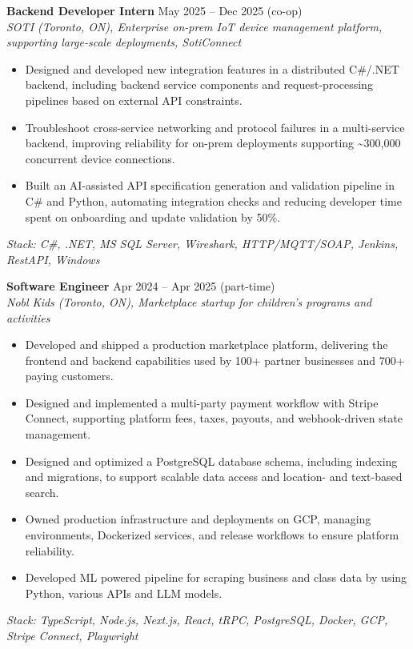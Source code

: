\documentclass[10pt,a4paper]{article}
\begin{document}
\textbf{Backend Developer Intern} \hfill May 2025 -- Dec 2025 (co-op)\\
\textit{SOTI (Toronto, ON), Enterprise on-prem IoT device management platform, supporting large-scale deployments, SotiConnect}
\begin{itemize}
    \item Designed and developed new integration features in a distributed C\#/.NET backend, including backend service components
    and request-processing pipelines based on external API constraints.
    \item Troubleshoot cross-service networking and protocol failures in a multi-service backend, improving reliability for on-prem
    deployments supporting \textasciitilde300{,}000 concurrent device connections.
    \item Built an AI-assisted API specification generation and validation pipeline in C\# and Python, automating integration checks and
    reducing developer time spent on onboarding and update validation by 50\%.
\end{itemize}
\textit{Stack: C\#, .NET, MS SQL Server, Wireshark, HTTP/MQTT/SOAP, Jenkins, RestAPI, Windows}

\vspace{0.45em}

\textbf{Software Engineer} \hfill Apr 2024 -- Apr 2025 (part-time)\\
\textit{Nobl Kids (Toronto, ON), Marketplace startup for children’s programs and activities}
\begin{itemize}
    \item Developed and shipped a production marketplace platform, delivering the frontend and backend capabilities used by 100+
    partner businesses and 700+ paying customers.
    \item Designed and implemented a multi-party payment workflow with Stripe Connect, supporting platform fees, taxes, payouts, and
    webhook-driven state management.
    \item Designed and optimized a PostgreSQL database schema, including indexing and migrations, to support scalable data access
    and location- and text-based search.
    \item Owned production infrastructure and deployments on GCP, managing environments, Dockerized services, and release
    workflows to ensure platform reliability.
    \item Developed ML powered pipeline for scraping business and class data by using Python, various APIs and LLM models.
\end{itemize}
\textit{Stack: TypeScript, Node.js, Next.js, React, tRPC, PostgreSQL, Docker, GCP, Stripe Connect, Playwright}
\end{document}
